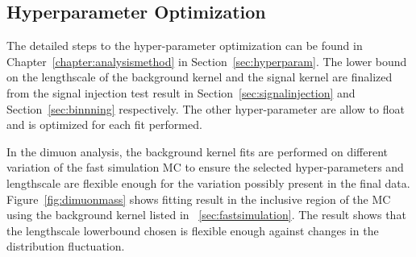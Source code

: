 \subsection{Hyperparameter Optimization}
The detailed steps to the hyper-parameter optimization can be found in Chapter~\ref{chapter:analysismethod} in Section~\ref{sec:hyperparam}.
The lower bound on the lengthscale of the background kernel and the signal kernel are finalized from the signal injection test result in Section~\ref{sec:signalinjection} and Section~\ref{sec:binnning} respectively. The other hyper-parameter are allow to float and is optimized for each fit performed. 

In the dimuon analysis, the background kernel fits are performed on different variation of the fast simulation MC to ensure the selected hyper-parameters and lengthscale are flexible enough for the variation possibly present in the final data. Figure~\ref{fig:dimuonmass} shows fitting result in the inclusive region of the MC using the background kernel listed in ~\ref{sec:fastsimulation}. The result shows that the lengthscale lowerbound chosen is flexible enough against changes in the distribution fluctuation. 


